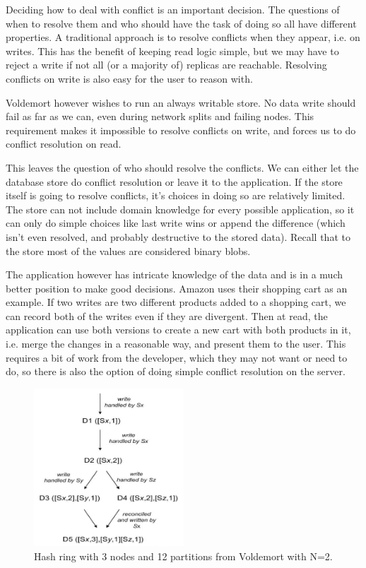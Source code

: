 Deciding how to deal with conflict is an important decision.
The questions of when to resolve them and who should have the task of doing so all have different properties.
A traditional approach is to resolve conflicts when they appear, i.e. on writes. 
This has the benefit of keeping read logic simple, but we may have to reject a write if not all (or a majority of) replicas are reachable. Resolving conflicts on write is also easy for the user to reason with.

Voldemort however wishes to run an always writable store. No data write should fail as far as we can, even during network splits and failing nodes.
This requirement makes it impossible to resolve conflicts on write, and forces us to do conflict resolution on read.

This leaves the question of who should resolve the conflicts. We can either let the database store do conflict resolution or leave it to the application.
If the store itself is going to resolve conflicts, it's choices in doing so are relatively limited.
The store can not include domain knowledge for every possible application, so it can only do simple choices like last write wins or append the difference (which isn't even resolved, and probably destructive to the stored data). Recall that to the store most of the values are considered binary blobs.

The application however has intricate knowledge of the data and is in a much better position to make good decisions. 
Amazon\cite{dynamo} uses their shopping cart as an example. If two writes are two different products added to a shopping cart, we can record both of the writes even if they are divergent.
Then at read, the application can use both versions to create a new cart with both products in it, i.e. merge the changes in a reasonable way, and present them to the user.
This requires a bit of work from the developer, which they may not want or need to do, so there is also the option of doing simple conflict resolution on the server.

\begin{figure}
    \includegraphics[width=0.5\textwidth]{introduction/versioning}
    \caption{Hash ring with 3 nodes and 12 partitions from Voldemort\cite{dynamo} with N=2.}
    \label{fig:versioning}
\end{figure}

